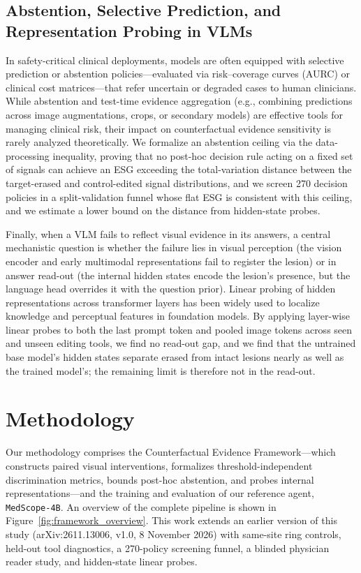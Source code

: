 \documentclass{article} %
\begin{document}
\subsection{Abstention, Selective Prediction, and Representation Probing in VLMs}
\label{subsec:rw_abstention}
In safety-critical clinical deployments, models are often equipped with selective prediction or abstention policies---evaluated via risk--coverage curves (AURC) \citep{geifman2017selective} or clinical cost matrices---that refer uncertain or degraded cases to human clinicians. While abstention and test-time evidence aggregation (e.g., combining predictions across image augmentations, crops, or secondary models) are effective tools for managing clinical risk, their impact on counterfactual evidence sensitivity is rarely analyzed theoretically. We formalize an abstention ceiling via the data-processing inequality, proving that no post-hoc decision rule acting on a fixed set of signals can achieve an ESG exceeding the total-variation distance between the target-erased and control-edited signal distributions, and we screen 270 decision policies in a split-validation funnel whose flat ESG is consistent with this ceiling, and we estimate a lower bound on the distance from hidden-state probes.

Finally, when a VLM fails to reflect visual evidence in its answers, a central mechanistic question is whether the failure lies in visual perception (the vision encoder and early multimodal representations fail to register the lesion) or in answer read-out (the internal hidden states encode the lesion's presence, but the language head overrides it with the question prior). Linear probing of hidden representations across transformer layers \citep{alain2016understanding} has been widely used to localize knowledge and perceptual features in foundation models. By applying layer-wise linear probes to both the last prompt token and pooled image tokens across seen and unseen editing tools, we find no read-out gap, and we find that the untrained base model's hidden states separate erased from intact lesions nearly as well as the trained model's; the remaining limit is therefore not in the read-out.

\section{Methodology}
\label{sec:method}
Our methodology comprises the Counterfactual Evidence Framework---which constructs paired visual interventions, formalizes threshold-independent discrimination metrics, bounds post-hoc abstention, and probes internal representations---and the training and evaluation of our reference agent, \texttt{MedScope-4B}. An overview of the complete pipeline is shown in Figure~\ref{fig:framework_overview}. This work extends an earlier version of this study \citep{gurram2026medscope} (arXiv:2611.13006, v1.0, 8 November 2026) with same-site ring controls, held-out tool diagnostics, a 270-policy screening funnel, a blinded physician reader study, and hidden-state linear probes.
\end{document}
